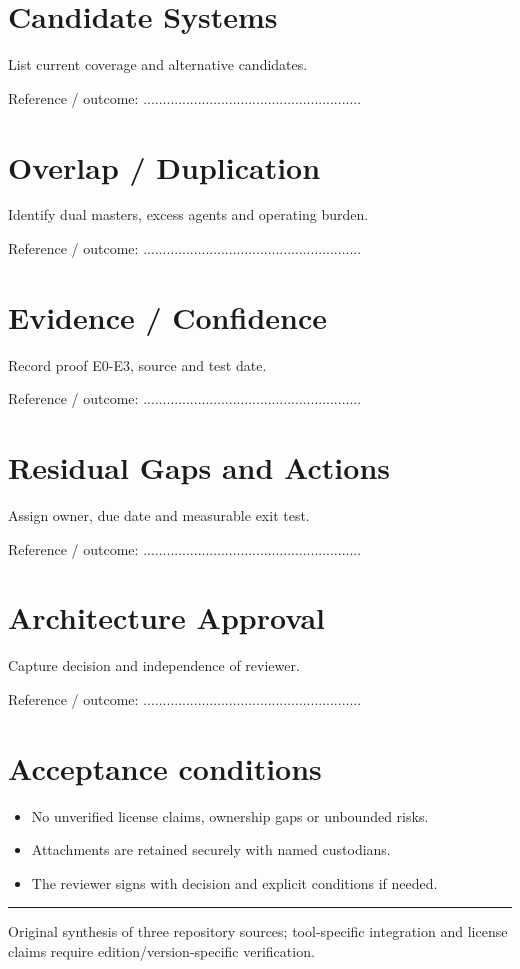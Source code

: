 \documentclass[10pt,letterpaper]{article}
\begin{document}
\section{Candidate Systems}
List current coverage and alternative candidates.\par
Reference / outcome: ........................................................\par
\section{Overlap / Duplication}
Identify dual masters, excess agents and operating burden.\par
Reference / outcome: ........................................................\par
\section{Evidence / Confidence}
Record proof E0-E3, source and test date.\par
Reference / outcome: ........................................................\par
\section{Residual Gaps and Actions}
Assign owner, due date and measurable exit test.\par
Reference / outcome: ........................................................\par
\section{Architecture Approval}
Capture decision and independence of reviewer.\par
Reference / outcome: ........................................................\par
\section{Acceptance conditions}
\begin{itemize}
\item No unverified license claims, ownership gaps or unbounded risks.
\item Attachments are retained securely with named custodians.
\item The reviewer signs with decision and explicit conditions if needed.
\end{itemize}
\vfill\noindent\color{muted}\rule{\linewidth}{0.4pt}\par\scriptsize Original synthesis of three repository sources; tool-specific integration and license claims require edition/version-specific verification.\normalsize
\end{document}
